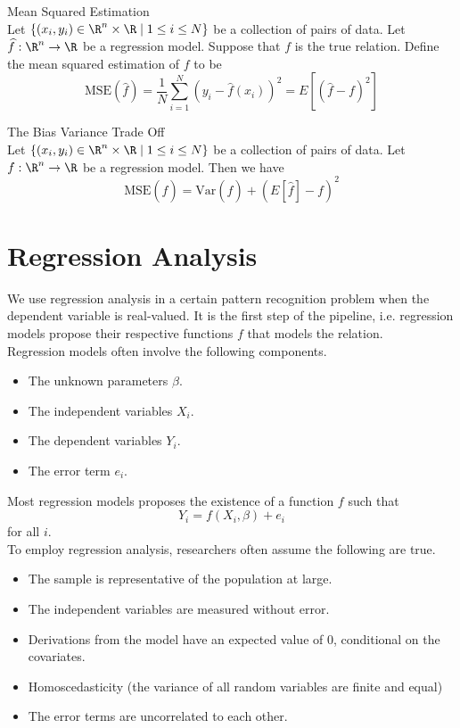 \documentclass[a4paper]{article}
\begin{document}
\begin{defn}{Mean Squared Estimation}{}\\
Let $\{(x_i,y_i)\in\R^n\times\R\;|\;1\leq i\leq N\}$ be a collection of pairs of data. Let $\widehat{f}:\R^n\to\R$ be a regression model. Suppose that $f$ is the true relation. Define the mean squared estimation of $f$ to be $$\text{MSE}(\widehat{f})=\frac{1}{N}\sum_{i=1}^N(y_i-\widehat{f}(x_i))^2=E[(\widehat{f}-f)^2]$$
\end{defn}

\begin{thm}{The Bias Variance Trade Off}{}\\
Let $\{(x_i,y_i)\in\R^n\times\R\;|\;1\leq i\leq N\}$ be a collection of pairs of data. Let $f:\R^n\to\R$ be a regression model. Then we have $$\text{MSE}(\widehat{f})=\text{Var}(\widehat{f})+(E[\widehat{f}]-f)^2$$
\end{thm}


\pagebreak
\section{Regression Analysis}
We use regression analysis in a certain pattern recognition problem when the dependent variable is real-valued. It is the first step of the pipeline, i.e. regression models propose their respective functions $f$ that models the relation. \\

Regression models often involve the following components. 
\begin{itemize}
\item The unknown parameters $\beta$. 
\item The independent variables $X_i$. 
\item The dependent variables $Y_i$. 
\item The error term $e_i$. 
\end{itemize}

Most regression models proposes the existence of a function $f$ such that $$Y_i=f(X_i,\beta)+e_i$$ for all $i$. \\

To employ regression analysis, researchers often assume the following are true. 
\begin{itemize}
\item The sample is representative of the population at large. 
\item The independent variables are measured without error. 
\item Derivations from the model have an expected value of $0$, conditional on the covariates. 
\item Homoscedasticity (the variance of all random variables are finite and equal)
\item The error terms are uncorrelated to each other. 
\end{itemize}
\end{document}
